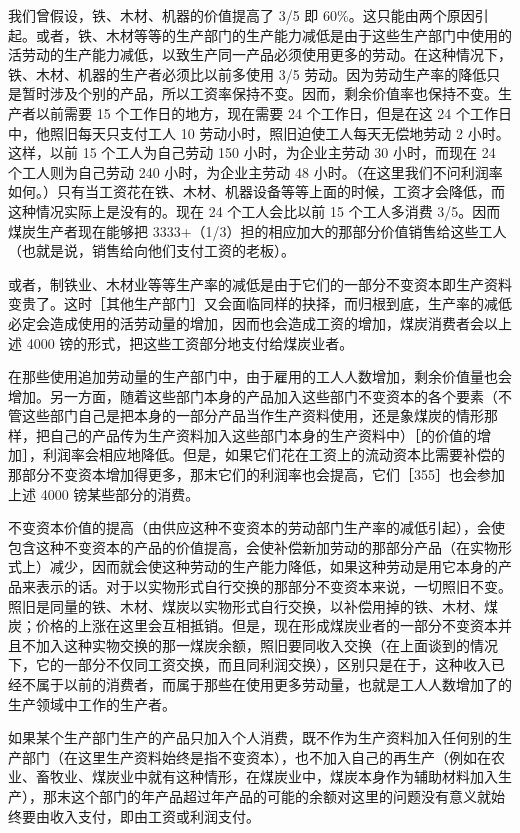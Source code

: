 我们曾假设，铁、木材、机器的价值提高了 3/5 即 60\%。这只能由两个原因引起。或者，铁、木材等等的生产部门的生产能力减低是由于这些生产部门中使用的活劳动的生产能力减低，以致生产同一产品必须使用更多的劳动。在这种情况下，铁、木材、机器的生产者必须比以前多使用 3/5 劳动。因为劳动生产率的降低只是暂时涉及个别的产品，所以工资率保持不变。因而，剩余价值率也保持不变。生产者以前需要 15 个工作日的地方，现在需要 24 个工作日，但是在这 24 个工作日中，他照旧每天只支付工人 10 劳动小时，照旧迫使工人每天无偿地劳动 2 小时。这样，以前 15 个工人为自己劳动 150 小时，为企业主劳动 30 小时，而现在 24 个工人则为自己劳动 240 小时，为企业主劳动 48 小时。（在这里我们不问利润率如何。）只有当工资花在铁、木材、机器设备等等上面的时候，工资才会降低，而这种情况实际上是没有的。现在 24 个工人会比以前 15 个工人多消费 3/5。因而煤炭生产者现在能够把 3333+（1/3）担的相应加大的那部分价值销售给这些工人（也就是说，销售给向他们支付工资的老板）。

或者，制铁业、木材业等等生产率的减低是由于它们的一部分不变资本即生产资料变贵了。这时［其他生产部门］又会面临同样的抉择，而归根到底，生产率的减低必定会造成使用的活劳动量的增加，因而也会造成工资的增加，煤炭消费者会以上述 4000 镑的形式，把这些工资部分地支付给煤炭业者。

在那些使用追加劳动量的生产部门中，由于雇用的工人人数增加，剩余价值量也会增加。另一方面，随着这些部门本身的产品加入这些部门不变资本的各个要素（不管这些部门自己是把本身的一部分产品当作生产资料使用，还是象煤炭的情形那样，把自己的产品传为生产资料加入这些部门本身的生产资料中）［的价值的增加］，利润率会相应地降低。但是，如果它们花在工资上的流动资本比需要补偿的那部分不变资本增加得更多，那末它们的利润率也会提高，它们［355］也会参加上述 4000 镑某些部分的消费。

不变资本价值的提高（由供应这种不变资本的劳动部门生产率的减低引起），会使包含这种不变资本的产品的价值提高，会使补偿新加劳动的那部分产品（在实物形式上）减少，因而就会使这种劳动的生产能力降低，如果这种劳动是用它本身的产品来表示的话。对于以实物形式自行交换的那部分不变资本来说，一切照旧不变。照旧是同量的铁、木材、煤炭以实物形式自行交换，以补偿用掉的铁、木材、煤炭；价格的上涨在这里会互相抵销。但是，现在形成煤炭业者的一部分不变资本并且不加入这种实物交换的那一煤炭余额，照旧要同收入交换（在上面谈到的情况下，它的一部分不仅同工资交换，而且同利润交换），区别只是在于，这种收入已经不属于以前的消费者，而属于那些在使用更多劳动量，也就是工人人数增加了的生产领域中工作的生产者。

如果某个生产部门生产的产品只加入个人消费，既不作为生产资料加入任何别的生产部门（在这里生产资料始终是指不变资本），也不加入自己的再生产（例如在农业、畜牧业、煤炭业中就有这种情形，在煤炭业中，煤炭本身作为辅助材料加入生产），那末这个部门的年产品\fontbox{~\{}超过年产品的可能的余额对这里的问题没有意义\fontbox{\}~}就始终要由收入支付，即由工资或利润支付。

